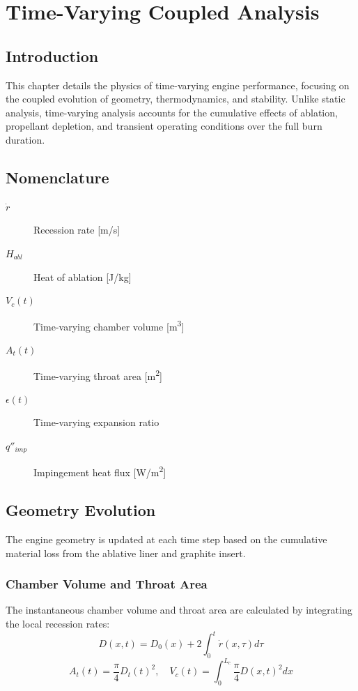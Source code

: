 \section{Time-Varying Coupled Analysis}

\subsection{Introduction}
This chapter details the physics of time-varying engine performance, focusing on the coupled evolution of geometry, thermodynamics, and stability. Unlike static analysis, time-varying analysis accounts for the cumulative effects of ablation, propellant depletion, and transient operating conditions over the full burn duration.

\subsection{Nomenclature}
\begin{description}
    \item[\(\dot{r}\)] Recession rate [\si{m/s}]
    \item[\(H_{abl}\)] Heat of ablation [\si{J/kg}]
    \item[\(V_c(t)\)] Time-varying chamber volume [\si{m^3}]
    \item[\(A_t(t)\)] Time-varying throat area [\si{m^2}]
    \item[\(\epsilon(t)\)] Time-varying expansion ratio
    \item[\(q''_{imp}\)] Impingement heat flux [\si{W/m^2}]
\end{description}

\subsection{Geometry Evolution}
The engine geometry is updated at each time step based on the cumulative material loss from the ablative liner and graphite insert.

\subsubsection{Chamber Volume and Throat Area}
The instantaneous chamber volume and throat area are calculated by integrating the local recession rates:
\begin{equation}
D(x, t) = D_0(x) + 2 \int_0^t \dot{r}(x, \tau) d\tau
\end{equation}
\begin{equation}
A_t(t) = \frac{\pi}{4} D_t(t)^2, \quad V_c(t) = \int_0^{L_c} \frac{\pi}{4} D(x, t)^2 dx
\end{equation}

